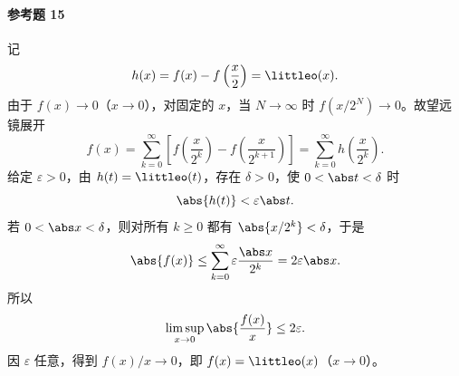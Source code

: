 \paragraph{参考题 15}
\begin{xsolution}
记
\[
  h(x)=f(x)-f\left(\frac x2\right)=\littleo(x).
\]
由于 $f(x)\to0$（$x\to0$），对固定的 $x$，当 $N\to\infty$ 时
$f(x/2^N)\to0$。故望远镜展开
\[
  f(x)
  =\sum_{k=0}^{\infty}
   \left[f\left(\frac{x}{2^k}\right)-f\left(\frac{x}{2^{k+1}}\right)\right]
  =\sum_{k=0}^{\infty}h\left(\frac{x}{2^k}\right).
\]
给定 $\varepsilon>0$，由 $h(t)=\littleo(t)$，存在 $\delta>0$，使
$0<\abs t<\delta$ 时
\[
  \abs{h(t)}<\varepsilon\abs t.
\]
若 $0<\abs x<\delta$，则对所有 $k\geq0$ 都有
$\abs{x/2^k}<\delta$，于是
\[
  \abs{f(x)}
  \leq\sum_{k=0}^{\infty}\varepsilon\frac{\abs x}{2^k}
  =2\varepsilon\abs x.
\]
所以
\[
  \limsup_{x\to0}\abs{\frac{f(x)}x}\leq2\varepsilon.
\]
因 $\varepsilon$ 任意，得到 $f(x)/x\to0$，即
$f(x)=\littleo(x)$（$x\to0$）。
\end{xsolution}
